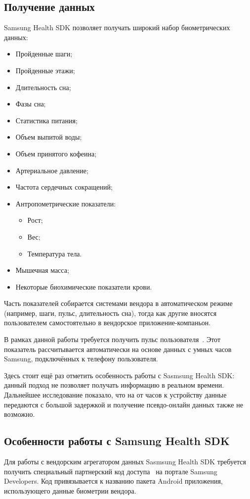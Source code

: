 \subsection{Получение данных}
Samsung Health SDK позволяет получать широкий набор биометрических данных:
\begin{multicols}{2}
	\begin{itemize}
		\item Пройденные шаги;
		\item Пройденные этажи;
		\item Длительность сна;
		\item Фазы сна;
		\item Статистика питания;
		\item Объем выпитой воды;
		\item Объем принятого кофеина;
		\item Артериальное давление;
		\item Частота сердечных сокращений;
		\item Антропометрические показатели:
		\begin{itemize}
			\item Рост;
			\item Вес;
			\item Температура тела.
		\end{itemize}
		\item Мышечная масса;
		\item Некоторые биохимические показатели крови.
	\end{itemize}
\end{multicols}
\smallskip
Часть показателей собирается системами вендора в автоматическом режиме (например, шаги, пульс, длительность сна), тогда как другие \textemdash\space вносятся пользователем самостоятельно в вендорское приложение-компаньон.

В рамках данной работы требуется получить пульс пользователя~\autocite{shsdk_heart_rate}. Этот показатель рассчитывается автоматически на основе данных с умных часов Samsung, подключённых к телефону пользователя.

Здесь стоит ещё раз отметить особенность работы с Sasmsung Health SDK: данный подход не позволяет получать информацию в реальном времени. Дальнейшее исследование показало, что на от часов к устройству данные передаются с большой задержкой и получение псевдо-онлайн данных также не возможно.

\subsection{Особенности работы с Samsung Health SDK}
Для работы с вендорским агрегатором данных Sasmsung Health SDK требуется получить специальный партнерский код доступа~\autocite{shsdk_dev_mode} на портале Samsung Developers. Код привязывается к названию пакета Android приложения, использующего данные биометрии вендора.

